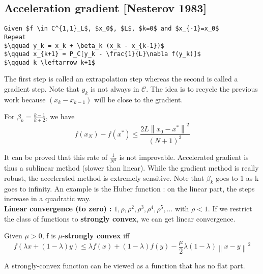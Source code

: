 \subsection{Acceleration gradient [Nesterov 1983]}


\begin{lstlisting}[mathescape,caption=Acceleration gradient]
Given $f \in C^{1,1}_L$, $x_0$, $L$, $k=0$ and $x_{-1}=x_0$
Repeat 
$\qquad y_k = x_k + \beta_k (x_k - x_{k-1})$
$\qquad x_{k+1} = P_C[y_k - \frac{1}{L}\nabla f(y_k)]$
$\qquad k \leftarrow k+1$
\end{lstlisting}

The first step is called an extrapolation step whereas the second is called a gradient step. Note that $y_k$ is not always in $\mathcal{C}$. The idea is to recycle the previous work because $(x_k - x_{k-1})$ will be close to the gradient.

\begin{theorem}
For $\beta_k=\frac{k-1}{k+2}$, we have
\begin{equation*}
f(x_N) -  f(x^*) \leq \frac{2L\left\|x_0 - x^*\right\|^2}{(N+1)^2}
\end{equation*}
\end{theorem}

It can be proved that this rate of $\frac{1}{N^2}$ is not improvable. Accelerated gradient is thus a sublinear method (slower than linear). While the gradient method is really robust, the accelerated method is extremely sensitive. Note that $\beta_k$ goes to 1 as k goes to infinity. An example is the Huber function : on the linear part, the steps increase in a quadratic way.\\

\textbf{Linear convergence (to zero) :} $1, \rho, \rho ^2, \rho ^3, \rho ^4, \rho ^5, ... $ with $\rho < 1$. If we restrict the class of functions to \textbf{strongly convex}, we can get linear convergence.\\

\begin{definition}
Given $\mu>0$, f is $\mu$-\textbf{strongly convex} iff
\begin{equation*}
f(\lambda x + (1-\lambda)y)\leq \lambda f(x) + (1-\lambda)f(y) - \frac{\mu}{2}\lambda (1-\lambda)\left\|x - y\right\|^2
\end{equation*}
\end{definition}

A strongly-convex function can be viewed as a function that has no flat part.

